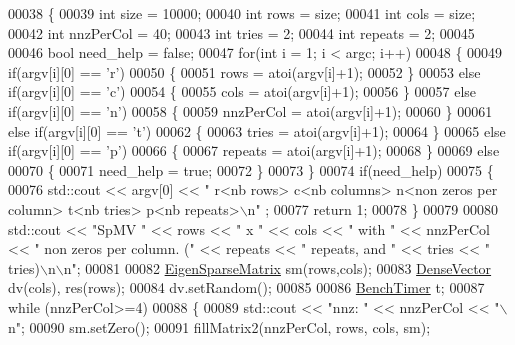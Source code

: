 \begin{DoxyCode}
00038 \{
00039   \textcolor{keywordtype}{int} size = 10000;
00040   \textcolor{keywordtype}{int} rows = size;
00041   \textcolor{keywordtype}{int} cols = size;
00042   \textcolor{keywordtype}{int} nnzPerCol = 40;
00043   \textcolor{keywordtype}{int} tries = 2;
00044   \textcolor{keywordtype}{int} repeats = 2;
00045 
00046   \textcolor{keywordtype}{bool} need\_help = \textcolor{keyword}{false};
00047   \textcolor{keywordflow}{for}(\textcolor{keywordtype}{int} i = 1; i < argc; i++)
00048   \{
00049     \textcolor{keywordflow}{if}(argv[i][0] == \textcolor{charliteral}{'r'})
00050     \{
00051       rows = atoi(argv[i]+1);
00052     \}
00053     \textcolor{keywordflow}{else} \textcolor{keywordflow}{if}(argv[i][0] == \textcolor{charliteral}{'c'})
00054     \{
00055       cols = atoi(argv[i]+1);
00056     \}
00057     \textcolor{keywordflow}{else} \textcolor{keywordflow}{if}(argv[i][0] == \textcolor{charliteral}{'n'})
00058     \{
00059       nnzPerCol = atoi(argv[i]+1);
00060     \}
00061     \textcolor{keywordflow}{else} \textcolor{keywordflow}{if}(argv[i][0] == \textcolor{charliteral}{'t'})
00062     \{
00063       tries = atoi(argv[i]+1);
00064     \}
00065     \textcolor{keywordflow}{else} \textcolor{keywordflow}{if}(argv[i][0] == \textcolor{charliteral}{'p'})
00066     \{
00067       repeats = atoi(argv[i]+1);
00068     \}
00069     \textcolor{keywordflow}{else}
00070     \{
00071       need\_help = \textcolor{keyword}{true};
00072     \}
00073   \}
00074   \textcolor{keywordflow}{if}(need\_help)
00075   \{
00076     std::cout << argv[0] << \textcolor{stringliteral}{" r<nb rows> c<nb columns> n<non zeros per column> t<nb tries> p<nb repeats>\(\backslash\)n"}
      ;
00077     \textcolor{keywordflow}{return} 1;
00078   \}
00079 
00080   std::cout << \textcolor{stringliteral}{"SpMV "} << rows << \textcolor{stringliteral}{" x "} << cols << \textcolor{stringliteral}{" with "} << nnzPerCol << \textcolor{stringliteral}{" non zeros per column. ("} << 
      repeats << \textcolor{stringliteral}{" repeats, and "} << tries << \textcolor{stringliteral}{" tries)\(\backslash\)n\(\backslash\)n"};
00081 
00082   \hyperlink{group___sparse_core___module}{EigenSparseMatrix} sm(rows,cols);
00083   \hyperlink{group___core___module}{DenseVector} dv(cols), res(rows);
00084   dv.setRandom();
00085 
00086   \hyperlink{class_eigen_1_1_bench_timer}{BenchTimer} t;
00087   \textcolor{keywordflow}{while} (nnzPerCol>=4)
00088   \{
00089     std::cout << \textcolor{stringliteral}{"nnz: "} << nnzPerCol << \textcolor{stringliteral}{"\(\backslash\)n"};
00090     sm.setZero();
00091     fillMatrix2(nnzPerCol, rows, cols, sm);

\end{DoxyCode}
